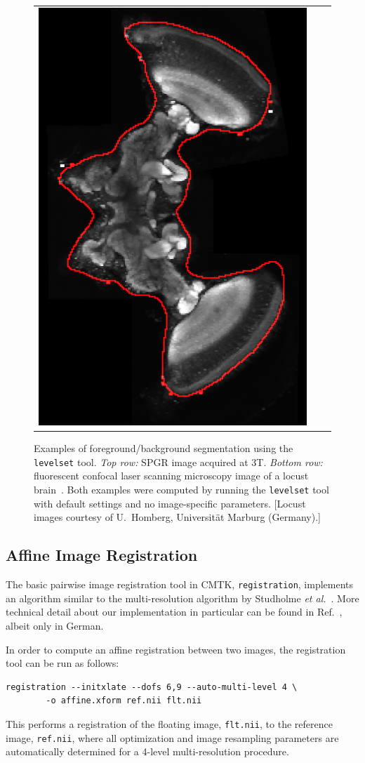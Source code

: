 \documentclass{InsightArticle}
\begin{document}
\begin{figure}[tb]
\begin{center}
\begin{tabular}{ccc}
\includegraphics[width=.3\linewidth]{img/levelset_locust_ovl}
\end{tabular}
\end{center}
\caption{Examples of foreground/background segmentation using the {\tt
levelset} tool. {\em Top row:\/} SPGR image acquired at 3T. {\em Bottom
row:\/} fluorescent confocal laser scanning microscopy image of a locust
brain~\cite{KuryRohlKrof:2008}. Both examples were computed by running the
{\tt levelset} tool with default settings and no image-specific
parameters. [Locust images courtesy of U.~Homberg, Universit\"at Marburg
(Germany).]  }
\label{fig:Levelset}
\end{figure}

\subsection{Affine Image Registration}

The basic pairwise image registration 
tool in CMTK, \verb|registration|,  implements an algorithm similar to the multi-resolution
algorithm by Studholme {\em et al.\/}~\cite{StudHillHawk:1997}. More technical
detail about our implementation in particular can be found in
Ref.~\cite{Rohlfing:2000}, albeit only in German.

In order to compute an affine registration  between
two images, the registration tool can be run as follows:
\begin{verbatim}
registration --initxlate --dofs 6,9 --auto-multi-level 4 \
        -o affine.xform ref.nii flt.nii
\end{verbatim}
This performs a registration of the floating image, \verb|flt.nii|, to the
reference image, \verb|ref.nii|, where all optimization and image resampling
parameters are automatically determined for a 4-level multi-resolution
procedure. 
\end{document}

